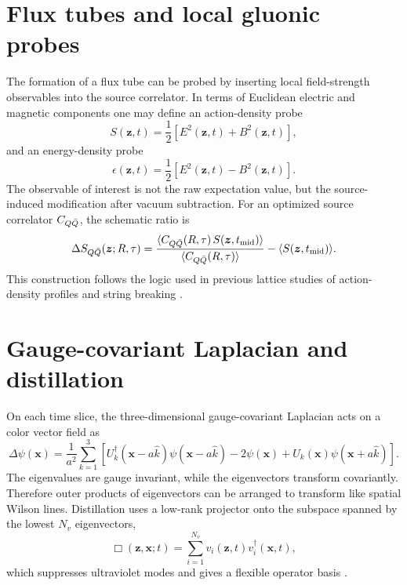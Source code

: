 \section{Flux tubes and local gluonic probes}
The formation of a flux tube can be probed by inserting local field-strength observables into the source correlator. In terms of Euclidean electric and magnetic components one may define an action-density probe
\begin{equation}
  S(\bm z,t)=\frac{1}{2}\left[E^2(\bm z,t)+B^2(\bm z,t)\right],
  \label{eq:action-density}
\end{equation}
and an energy-density probe
\begin{equation}
  \epsilon(\bm z,t)=\frac{1}{2}\left[E^2(\bm z,t)-B^2(\bm z,t)\right].
  \label{eq:energy-density}
\end{equation}
The observable of interest is not the raw expectation value, but the source-induced modification after vacuum subtraction. For an optimized source correlator \(C_{Q\bar Q}\), the schematic ratio is
\begin{equation}
  \Delta S_{Q\bar Q}(\bm z;R,\tau)
  =\frac{\langle C_{Q\bar Q}(R,\tau)\,S(\bm z,t_{\mathrm{mid}})\rangle}
  {\langle C_{Q\bar Q}(R,\tau)\rangle}
  -\langle S(\bm z,t_{\mathrm{mid}})\rangle.
  \label{eq:source-probe-ratio}
\end{equation}
This construction follows the logic used in previous lattice studies of action-density profiles and string breaking \cite{Bali2005}.

\section{Gauge-covariant Laplacian and distillation}
On each time slice, the three-dimensional gauge-covariant Laplacian acts on a color vector field as
\begin{equation}
  \Delta \psi(\bm x)=\frac{1}{a^2}\sum_{k=1}^{3}
  \left[U_k^\dagger(\bm x-a\hat k)\psi(\bm x-a\hat k)-2\psi(\bm x)
  +U_k(\bm x)\psi(\bm x+a\hat k)\right].
  \label{eq:covariant-laplacian}
\end{equation}
The eigenvalues are gauge invariant, while the eigenvectors transform covariantly. Therefore outer products of eigenvectors can be arranged to transform like spatial Wilson lines. Distillation uses a low-rank projector onto the subspace spanned by the lowest \(N_v\) eigenvectors,
\begin{equation}
  \Box(\bm z,\bm x;t)=\sum_{i=1}^{N_v} v_i(\bm z,t)v_i^\dagger(\bm x,t),
  \label{eq:distillation-projector}
\end{equation}
which suppresses ultraviolet modes and gives a flexible operator basis \cite{Peardon2009}.
